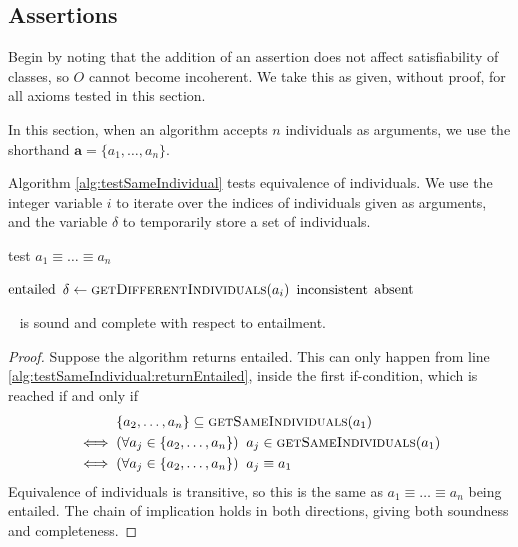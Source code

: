 \documentclass[paper.tex]{subfiles}
\begin{document}
\subsection{Assertions}
\label{sec:algorithms:assert}

Begin by noting that the addition of an assertion does not affect satisfiability of classes, so $O$ cannot become incoherent.  We take this as given, without proof, for all axioms tested in this section.

In this section, when an algorithm accepts $n$ individuals as arguments, we use the shorthand $\mathbf{a} = \{a_1, \ldots, a_n\}$.

Algorithm \ref{alg:testSameIndividual} tests equivalence of individuals.  We use the integer variable $i$ to iterate over the indices of individuals given as arguments, and the variable $\delta$ to temporarily store a set of individuals.

\begin{algorithm}[H]
  \caption{test $a_1 \equiv \ldots \equiv a_n$}
  \label{alg:testSameIndividual}
  \begin{algorithmic}[1]
    \raggedright
        \State \Return $\mathrm{entailed}$
        \label{alg:testSameIndividual:returnEntailed}
      \Else
          \State $\delta \gets \Call{getDifferentIndividuals}{a_i}$
            \State \Return $\mathrm{inconsistent}$
            \label{alg:testSameIndividual:returnInconsistent}
          \EndIf
        \EndFor
        \State \Return $\mathrm{absent}$
      \EndIf
    \EndFunction
  \end{algorithmic}
\end{algorithm}

\begin{proposition}
  \label{prop:testSameIndividualEntailed}
  \sloppy~
   is sound and complete with respect to entailment.
\end{proposition}
\begin{proof}
  Suppose the algorithm returns entailed.  This can only happen from line \ref{alg:testSameIndividual:returnEntailed}, inside the first if-condition, which is reached if and only if
  \begin{align*}
    & \{a_2, \ldots, a_n\} \subseteq \Call{getSameIndividuals}{a_1} \\
    \iff{}&(\forall a_j \in \{a_2, \ldots, a_n\}) \;\; a_j \in \Call{getSameIndividuals}{a_1} \\
    \iff{}& (\forall a_j \in \{a_2, \ldots, a_n\}) \;\; a_j \equiv a_1
  \end{align*}
  Equivalence of individuals is transitive, so this is the same as $a_1 \equiv \ldots \equiv a_n$ being entailed.  The chain of implication holds in both directions, giving both soundness and completeness.
\end{proof}
\end{document}
